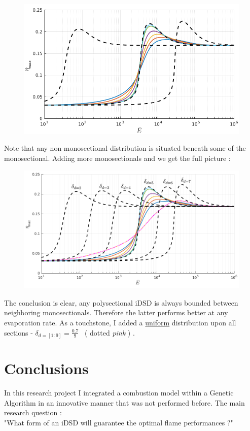 \documentclass[12pt]{article}
\numberwithin{equation}{section}
\begin{document}
\begin{flushleft}
\begin{figure}[H]
\centering
\includegraphics[width=0.815  \linewidth, center]{multi_graph_full_07.png}
\end{figure}
Note that any non-monosectional distribution is situated beneath some of the monosectional. Adding more monosectionals and we get the full picture :
\begin{figure}[H]
\centering
\includegraphics[width=0.875  \linewidth, center]{multi_graph_bounded_a.png}
\end{figure}
The conclusion is clear, any polysectional iDSD is always bounded between neighboring monosectionals. Therefore the latter performs better at any evaporation rate. As a touchstone, I added a \underline{uniform} distribution upon all sections  - $\delta_{d=[1:9]} = \frac{0.7}{9}$ \ ( dotted \textit{pink} ) . 

\newpage

\section{Conclusions}

In this research project I integrated a combustion model within a Genetic Algorithm in an innovative manner that was not performed before. The main research question : \\
\hspace{20mm} "What form of an iDSD will guarantee the optimal flame performances ?"


\end{flushleft}
\end{document}
